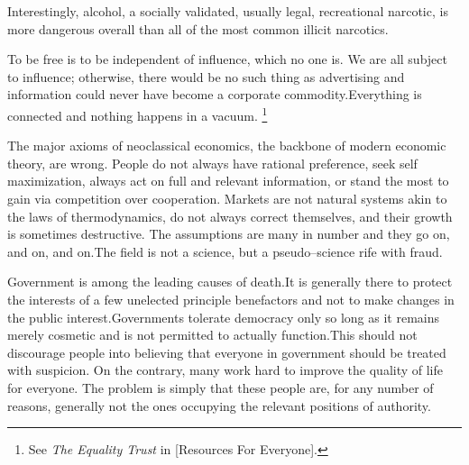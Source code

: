 Interestingly, alcohol, a socially validated, usually legal, recreational narcotic, is more dangerous overall than all of the most common illicit narcotics.\footnotecite[extras={ See figure 2.}][nutt2010]


To be free is to be independent of influence, which no one is. We are all subject to influence; otherwise, there would be no such thing as advertising and information could never have become a corporate commodity.\footnotecite[santoso2008] Everything is connected and nothing happens in a vacuum. \footnote{See {\it The Equality Trust} in [Resources For Everyone].}


The major axioms of neoclassical economics, the backbone of modern economic theory, are wrong. People do not always have rational preference, seek self maximization, always act on full and relevant information, or stand the most to gain via competition over cooperation. Markets are not natural systems akin to the laws of thermodynamics, do not always correct themselves, and their growth is sometimes destructive. The assumptions are many in number and they go on, and on, and on.\footnotecite[raj2010]\footnotecite[cobb1999] The field is not a science, but a pseudo--science rife with fraud.


Government is among the leading causes of death. It is generally there to protect the interests of a few unelected principle benefactors and not to make changes in the public interest. Governments tolerate democracy only so long as it remains merely cosmetic and is not permitted to actually function. This should not discourage people into believing that everyone in government should be treated with suspicion. On the contrary, many work hard to improve the quality of life for everyone. The problem is simply that these people are, for any number of reasons, generally not the ones occupying the relevant positions of authority.


